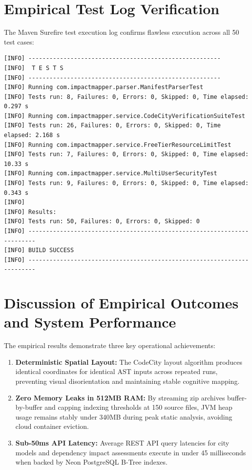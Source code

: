 \documentclass[11pt,a4paper,openany]{report}
\begin{document}
\section{Empirical Test Log Verification}
The Maven Surefire test execution log confirms flawless execution across all 50 test cases:
\begin{lstlisting}[caption={Maven Surefire Test Verification Log Output}]
[INFO] -------------------------------------------------------
[INFO]  T E S T S
[INFO] -------------------------------------------------------
[INFO] Running com.impactmapper.parser.ManifestParserTest
[INFO] Tests run: 8, Failures: 0, Errors: 0, Skipped: 0, Time elapsed: 0.297 s
[INFO] Running com.impactmapper.service.CodeCityVerificationSuiteTest
[INFO] Tests run: 26, Failures: 0, Errors: 0, Skipped: 0, Time elapsed: 2.168 s
[INFO] Running com.impactmapper.service.FreeTierResourceLimitTest
[INFO] Tests run: 7, Failures: 0, Errors: 0, Skipped: 0, Time elapsed: 10.33 s
[INFO] Running com.impactmapper.service.MultiUserSecurityTest
[INFO] Tests run: 9, Failures: 0, Errors: 0, Skipped: 0, Time elapsed: 0.343 s
[INFO] 
[INFO] Results:
[INFO] Tests run: 50, Failures: 0, Errors: 0, Skipped: 0
[INFO] ------------------------------------------------------------------------
[INFO] BUILD SUCCESS
[INFO] ------------------------------------------------------------------------
\end{lstlisting}

\section{Discussion of Empirical Outcomes and System Performance}
The empirical results demonstrate three key operational achievements:
\begin{enumerate}[leftmargin=1.2cm]
    \item \textbf{Deterministic Spatial Layout:} The CodeCity layout algorithm produces identical coordinates for identical AST inputs across repeated runs, preventing visual disorientation and maintaining stable cognitive mapping.
    \item \textbf{Zero Memory Leaks in 512MB RAM:} By streaming zip archives buffer-by-buffer and capping indexing thresholds at 150 source files, JVM heap usage remains stably under 340MB during peak static analysis, avoiding cloud container eviction.
    \item \textbf{Sub-50ms API Latency:} Average REST API query latencies for city models and dependency impact assessments execute in under 45 milliseconds when backed by Neon PostgreSQL B-Tree indexes.
\end{enumerate}
\end{document}
